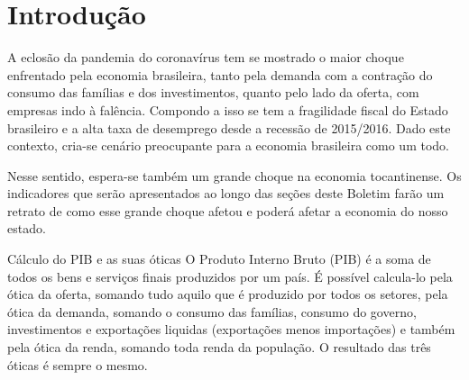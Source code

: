 \chapter{Introdução}
\par A eclosão da pandemia do coronavírus tem se mostrado o maior choque enfrentado pela economia brasileira, tanto pela demanda com a contração do consumo das famílias e dos investimentos, quanto pelo lado da oferta, com empresas indo à falência. Compondo a isso se tem a fragilidade fiscal do Estado brasileiro e a alta taxa de desemprego desde a recessão de 2015/2016. Dado este contexto, cria-se cenário preocupante para a economia brasileira como um todo.
\par Nesse sentido, espera-se também um grande choque na economia tocantinense. Os indicadores que serão apresentados ao longo das seções deste Boletim farão um retrato de como esse grande choque afetou e poderá afetar a economia do nosso estado.
\begin{smbox}[label={labelbox},nameref={Cálculo do PIB e as suas óticas}]{Cálculo do PIB e as suas óticas}
	O Produto Interno Bruto (PIB) é a soma de todos os bens e serviços finais produzidos por um país. É possível calcula-lo pela ótica da oferta, somando tudo aquilo que é produzido por todos os setores, pela ótica da demanda, somando o consumo das famílias, consumo do governo, investimentos e exportações liquidas (exportações menos importações) e também pela ótica da renda, somando toda renda da população. O resultado das três óticas é sempre o mesmo.
\end{smbox}

